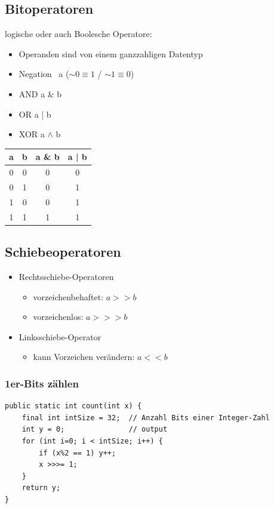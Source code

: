 \documentclass[a4paper,10pt]{article}
\begin{document}
\subsection{Bitoperatoren}
logische oder auch Boolesche Operatore:
\begin{itemize}
	\item Operanden sind von einem ganzzahligen Datentyp
	\item Negation ~a ($\sim 0 \equiv 1$ / $\sim 1\equiv 0$)
	\item AND a \& b
	\item OR a | b
	\item XOR a $\wedge$  b
\end{itemize}
\begin{tabular}{|c|c|c|c|}
	\hline
	a & b & {a \& b} & a | b \\
	\hline
	0 & 0 & 0 & 0 \\
	0 & 1 & 0 & 1 \\
	1 & 0 & 0 & 1 \\
	1 & 1 & 1 & 1 \\
	\hline
\end{tabular}

\subsection{Schiebeoperatoren}
\begin{itemize}
	\item Rechtsschiebe-Operatoren
		\begin{itemize}
			\item vorzeichenbehaftet: $a >> b$
			\item vorzeichenlos: $a >>> b$
		\end{itemize}
	\item Linksschiebe-Operator
		\begin{itemize}
			\item kann Vorzeichen verändern:  $a << b$
		\end{itemize}
\end{itemize}

\subsubsection{1er-Bits zählen}
\begin{lstlisting}
public static int count(int x) {
	final int intSize = 32;  // Anzahl Bits einer Integer-Zahl
	int y = 0;               // output
	for (int i=0; i < intSize; i++) { 
		if (x%2 == 1) y++;
		x >>>= 1;
	}
	return y;
}

\end{lstlisting}
\end{document}
